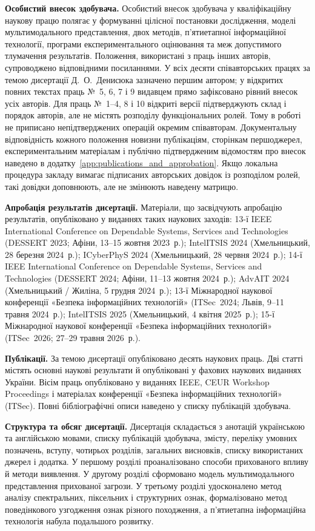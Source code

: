 \textbf{Особистий внесок здобувача.}
Особистий внесок здобувача у кваліфікаційну наукову працю полягає у формуванні цілісної постановки дослідження, моделі мультимодального представлення, двох методів, п’ятиетапної інформаційної технології, програми експериментального оцінювання та меж допустимого тлумачення результатів. Положення, використані з праць інших авторів, супроводжено відповідними посиланнями. У всіх десяти співавторських працях за темою дисертації Д.~О.~Денисюка зазначено першим автором; у відкритих повних текстах праць №~5, 6, 7 і 9 видавцем прямо зафіксовано рівний внесок усіх авторів. Для праць №~1--4, 8 і 10 відкриті версії підтверджують склад і порядок авторів, але не містять розподілу функціональних ролей. Тому в роботі не приписано непідтверджених операцій окремим співавторам. Документальну відповідність кожного положення новизни публікаціям, сторінкам першоджерел, експериментальним матеріалам і публічно підтвердженим відомостям про внесок наведено в додатку~\ref{app:publications_and_approbation}. Якщо локальна процедура закладу вимагає підписаних авторських довідок із розподілом ролей, такі довідки доповнюють, але не змінюють наведену матрицю.

\textbf{Апробація результатів дисертації.}
Матеріали, що засвідчують апробацію результатів, опубліковано у виданнях таких наукових заходів: 13-ї IEEE International Conference on Dependable Systems, Services and Technologies (DESSERT 2023; Афіни, 13--15 жовтня 2023~р.); IntelITSIS 2024 (Хмельницький, 28 березня 2024~р.); ICyberPhyS 2024 (Хмельницький, 28 червня 2024~р.); 14-ї IEEE International Conference on Dependable Systems, Services and Technologies (DESSERT 2024; Афіни, 11--13 жовтня 2024~р.); AdvAIT 2024 (Хмельницький / Жиліна, 5 грудня 2024~р.); 13-ї Міжнародної наукової конференції «Безпека інформаційних технологій» (ITSec~2024; Львів, 9--11 травня 2024~р.); IntelITSIS 2025 (Хмельницький, 4 квітня 2025~р.); 15-ї Міжнародної наукової конференції «Безпека інформаційних технологій» (ITSec~2026; 27--29 травня 2026~р.).

\textbf{Публікації.}
За темою дисертації опубліковано десять наукових праць. Дві статті містять основні наукові результати й опубліковані у фахових наукових виданнях України. Вісім праць опубліковано у виданнях IEEE, CEUR Workshop Proceedings і матеріалах конференції «Безпека інформаційних технологій» (ITSec). Повні бібліографічні описи наведено у списку публікацій здобувача.

\textbf{Структура та обсяг дисертації.}
Дисертація складається з анотацій українською та англійською мовами, списку публікацій здобувача, змісту, переліку умовних позначень, вступу, чотирьох розділів, загальних висновків, списку використаних джерел і додатка. У першому розділі проаналізовано способи прихованого впливу й методи виявлення. У другому розділі сформовано модель мультимодального представлення прихованої загрози. У третьому розділі удосконалено метод аналізу спектральних, піксельних і структурних ознак, формалізовано метод поведінкового узгодження ознак різного походження, а п’ятиетапна інформаційна технологія набула подальшого розвитку.

